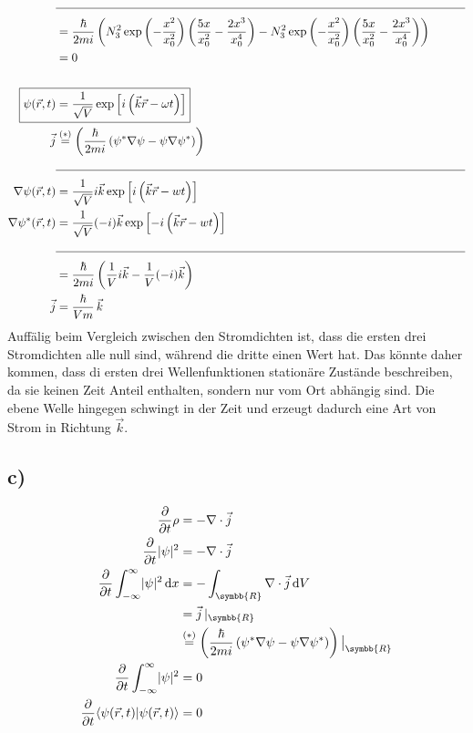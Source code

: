 \begin{align*}
        &\text{\noindent\makebox[\linewidth]{\rule{\linewidth}{0.4pt}}}\\
        &= \frac{\hbar}{2mi} \left( N_3^2 \exp \left( -\frac{x^2}{x_0^2} \right) \left( \frac{5x}{x_0^2} - \frac{2x^3}{x_0^4} \right) - N_3^2 \exp \left( -\frac{x^2}{x_0^2} \right) \left( \frac{5x}{x_0^2} - \frac{2x^3}{x_0^4} \right) \right)\\
        &= 0\\
        \\
        \Aboxed{\psi(\vec{r}, t) &= \frac{1}{\sqrt{V}} \exp \left[ i \left( \vec{k} \vec{r} - \omega t \right) \right]}\\
        \vec{j} &\stackrel{(*)}{=} \left( \frac{\hbar}{2mi} \left( \psi^* \nabla \psi - \psi \nabla \psi^* \right) \right)\\
        &\text{\noindent\makebox[\linewidth]{\rule{\linewidth}{0.4pt}}}\\
        \nabla \psi(\vec{r}, t) &= \frac{1}{\sqrt{V}} i\vec{k} \exp \left[ i \left( \vec{k} \vec{r} - wt \right) \right]\\
        \nabla \psi^*(\vec{r}, t) &= \frac{1}{\sqrt{V}} (-i)\vec{k} \exp \left[ -i \left( \vec{k} \vec{r} - wt \right) \right]\\
        &\text{\noindent\makebox[\linewidth]{\rule{\linewidth}{0.4pt}}}\\
        &= \frac{\hbar}{2mi} \left( \frac{1}{V} i\vec{k} - \frac{1}{V} (-i)\vec{k} \right)\\
        \vec{j} &= \frac{\hbar}{Vm}\, \vec{k}
    \end{align*}
  Auffälig beim Vergleich zwischen den Stromdichten ist, dass die ersten drei Stromdichten alle null sind, 
    während die dritte einen Wert hat. Das könnte daher kommen, dass di ersten drei Wellenfunktionen 
    stationäre Zustände beschreiben, da sie keinen Zeit Anteil enthalten, sondern nur vom Ort abhängig sind.
    Die ebene Welle hingegen schwingt in der Zeit und erzeugt dadurch eine Art von Strom in Richtung $\vec{k}$.

\newpage
\subsection{c)}

    \begin{align*}
        \frac{\partial}{\partial t} \rho &= -\nabla \cdot \vec{j}\\
        \frac{\partial}{\partial t} \abs{\psi}^2 &= - \nabla \cdot \vec{j}\\
        \frac{\partial}{\partial t} \int_{-\infty}^{\infty}  \abs{\psi}^2 \,\mathrm{d}x &= -\int_{\symbb{R}} \nabla \cdot \vec{j} \,\mathrm{d}V\\
        &= \vec{j}\, \vert_{\symbb{R}}\\
        &\stackrel{(*)}{=} \left( \frac{\hbar}{2mi} \left( \psi^* \nabla \psi - \psi \nabla \psi^*   \right) \right) \big| _{\symbb{R}}\\
        \frac{\partial}{\partial t} \int_{-\infty}^{\infty} \abs{\psi}^2 &= 0\\
        \frac{\partial}{\partial t} \langle \psi(\vec{r}, t) \vert \psi(\vec{r}, t) \rangle &= 0
    \end{align*}
  
